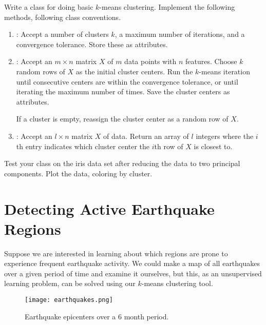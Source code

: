 \begin{problem}
Write a  class for doing basic $k$-means clustering.
Implement the following methods, following  class conventions.
\begin{enumerate}
\item {}: Accept a number of clusters $k$, a maximum number of iterations, and a convergence tolerance.
Store these as attributes.

\item {}: Accept an $m \times n$ matrix $X$ of $m$ data points with $n$ features.
Choose $k$ random rows of $X$ as the initial cluster centers.
Run the $k$-means iteration until consecutive centers are within the convergence tolerance, or until iterating the maximum number of times.
Save the cluster centers as attributes.

If a cluster is empty, reassign the cluster center as a random row of $X$.

\item {}: Accept an $l \times n$ matrix $X$ of data.
Return an array of $l$ integers where the $i$th entry indicates which cluster center the $i$th row of $X$ is closest to.
\end{enumerate}
%
Test your class on the iris data set after reducing the data to two principal components.
Plot the data, coloring by cluster.
\end{problem}

\section*{Detecting Active Earthquake Regions} %

Suppose we are interested in learning about which regions are prone to experience frequent earthquake activity.
We could make a map of all earthquakes over a given period of time and examine it ourselves, but this, as an unsupervised learning problem, can be solved using our $k$-means clustering tool.

\begin{figure}[H]
    \centering
    \texttt{[image: earthquakes.png]}
    \caption{Earthquake epicenters over a 6 month period.}
    \label{fig:earthquakes}
\end{figure}

